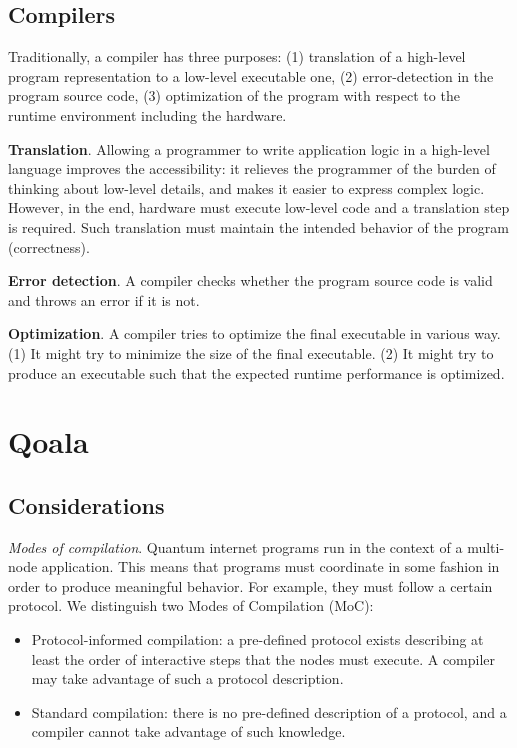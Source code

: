 \subsection{Compilers}
Traditionally, a compiler has three purposes:
(1) translation of a high-level program representation to a low-level executable one,
(2) error-detection in the program source code,
(3) optimization of the program with respect to the runtime environment including the hardware.

\textbf{Translation}. Allowing a programmer to write application logic in a high-level language improves the accessibility: it relieves the programmer of the burden of thinking about low-level details, and makes it easier to express complex logic. However, in the end, hardware must execute low-level code and a translation step is required. Such translation must maintain the intended behavior of the program (correctness).

\textbf{Error detection}. A compiler checks whether the program source code is valid and throws an error if it is not.

\textbf{Optimization}. A compiler tries to optimize the final executable in various way. (1) It might try to minimize the size of the final executable. (2) It might try to produce an executable such that the expected runtime performance is optimized.

\section{Qoala}

\subsection{Considerations}

\textit{Modes of compilation}. Quantum internet programs run in the context of a multi-node application.
This means that programs must coordinate in some fashion in order to produce meaningful behavior.
For example, they must follow a certain protocol.
We distinguish two Modes of Compilation (MoC):
\begin{itemize}
    \item Protocol-informed compilation: a pre-defined protocol exists describing at least the order of interactive steps that the nodes must execute. A compiler may take advantage of such a protocol description.
    \item Standard compilation: there is no pre-defined description of a protocol, and a compiler cannot take advantage of such knowledge.
\end{itemize}

